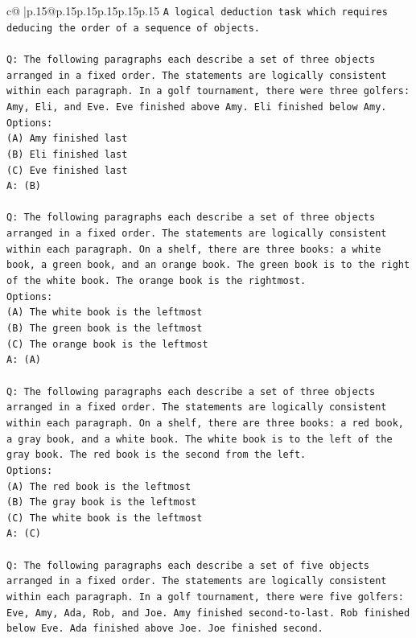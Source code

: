 \documentclass{article}
\begin{document}
{\begin{supertabular}{c@{$\;$}|p{.15\linewidth}@{}p{.15\linewidth}p{.15\linewidth}p{.15\linewidth}p{.15\linewidth}p{.15\linewidth}}
{{{\texttt{A logical deduction task which requires deducing the order of a sequence of objects.} \\
\\ 
\texttt{Q: The following paragraphs each describe a set of three objects arranged in a fixed order. The statements are logically consistent within each paragraph. In a golf tournament, there were three golfers: Amy, Eli, and Eve. Eve finished above Amy. Eli finished below Amy.} \\
\texttt{Options:} \\
\texttt{(A) Amy finished last} \\
\texttt{(B) Eli finished last} \\
\texttt{(C) Eve finished last} \\
\texttt{A: (B)} \\
\\ 
\texttt{Q: The following paragraphs each describe a set of three objects arranged in a fixed order. The statements are logically consistent within each paragraph. On a shelf, there are three books: a white book, a green book, and an orange book. The green book is to the right of the white book. The orange book is the rightmost.} \\
\texttt{Options:} \\
\texttt{(A) The white book is the leftmost} \\
\texttt{(B) The green book is the leftmost} \\
\texttt{(C) The orange book is the leftmost} \\
\texttt{A: (A)} \\
\\ 
\texttt{Q: The following paragraphs each describe a set of three objects arranged in a fixed order. The statements are logically consistent within each paragraph. On a shelf, there are three books: a red book, a gray book, and a white book. The white book is to the left of the gray book. The red book is the second from the left.} \\
\texttt{Options:} \\
\texttt{(A) The red book is the leftmost} \\
\texttt{(B) The gray book is the leftmost} \\
\texttt{(C) The white book is the leftmost} \\
\texttt{A: (C)} \\
\\ 
\texttt{Q: The following paragraphs each describe a set of five objects arranged in a fixed order. The statements are logically consistent within each paragraph. In a golf tournament, there were five golfers: Eve, Amy, Ada, Rob, and Joe. Amy finished second{-}to{-}last. Rob finished below Eve. Ada finished above Joe. Joe finished second.} \\
}}}
\end{supertabular}}
\end{document}
